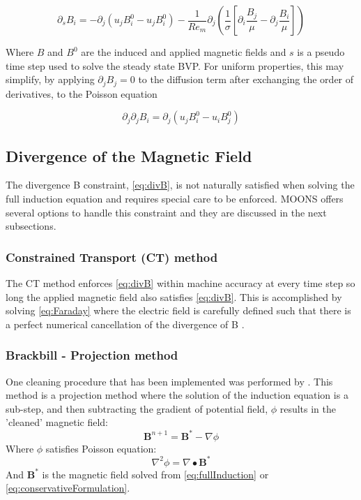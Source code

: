 \documentclass[11pt]{article}
\begin{document}
\begin{equation} \label{eq:LowRemPsuedo}
\partial_s B_i = -\partial_j (u_j B_i^0 - u_j B_i^0)
-\frac{1}{Re_m} \partial_j \left( \frac{1}{\sigma} \left[ \partial_i \frac{B_j}{\mu} - \partial_j \frac{B_i}{\mu} \right] \right)
\end{equation}

Where $B$ and $B^0$ are the induced and applied magnetic fields and $s$ is a pseudo time step used to solve the steady state BVP. For uniform properties, this may simplify, by applying $\partial_j B_j = 0$ to the diffusion term after exchanging the order of derivatives, to the Poisson equation

\begin{equation} \label{eq:LowRemPoisson}
\partial_j \partial_j B_i = \partial_j (u_j B_i^0 - u_i B_j^0)
\end{equation}

\subsection{Divergence of the Magnetic Field}
The divergence B constraint, \ref{eq:divB}, is not naturally satisfied when solving the full induction equation and requires special care to be enforced. MOONS offers several options to handle this constraint and they are discussed in the next subsections.

\subsubsection{Constrained Transport (CT) method}
The CT method enforces \ref{eq:divB} within machine accuracy at every time step so long the applied magnetic field also satisfies \ref{eq:divB}. This is accomplished by solving \ref{eq:Faraday} where the electric field is carefully defined such that there is a perfect numerical cancellation of the divergence of B \cite{Toth2000}.

\subsubsection{Brackbill - Projection method}
One cleaning procedure that has been implemented was performed by \citep{Brackbill1980}. This method is a projection method where the solution of the induction equation is a sub-step, and then subtracting the gradient of potential field, $\phi$ results in the 'cleaned' magnetic field:
\begin{equation}  \label{eq:Projection}
\pmb{B}^{n+1} = \pmb{B}^* - \nabla \phi
\end{equation}
Where $\phi$ satisfies Poisson equation:
\begin{equation} 
\nabla^2 \phi = \nabla \bullet \pmb{B}^*
\end{equation}
And $\pmb{B}^*$ is the magnetic field solved from \ref{eq:fullInduction} or \ref{eq:conservativeFormulation}.
\end{document}

